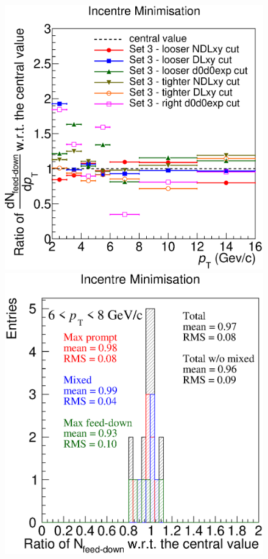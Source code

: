 \documentclass[b5paper,10pt,twoside,oldstyle,classica]{toptesi}
\begin{document}
\begin{figure}[tb]
\begin{center}
{\includegraphics[scale = 0.32]{CutVarSet3_FD_Inc_syst_cutsets_ratioonly.eps}}
\hspace{-0.5cm}
{\includegraphics[scale = 0.32]{DispFDInc4.eps}}

\end{center}
\end{figure}
\end{document}
